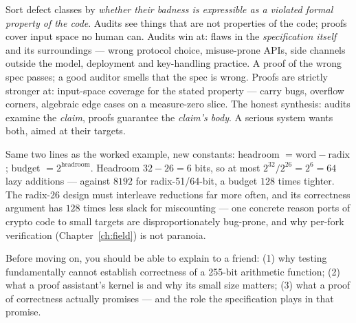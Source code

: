 \pathway Sort defect classes by \emph{whether their badness is expressible
as a violated formal property of the code}. Audits see things that are not
properties of the code; proofs cover input space no human can.
\answer Audits win at: flaws in the \emph{specification itself} and its
surroundings --- wrong protocol choice, misuse-prone APIs, side channels
outside the model, deployment and key-handling practice. A proof of the
wrong spec passes; a good auditor smells that the spec is wrong. Proofs are
strictly stronger at: input-space coverage for the stated property ---
carry bugs, overflow corners, algebraic edge cases on a measure-zero slice.
The honest synthesis: audits examine the \emph{claim}, proofs guarantee the
\emph{claim's body}. A serious system wants both, aimed at their targets.

\pathway Same two lines as the worked example, new constants: headroom
$= \text{word} - \text{radix}$; budget $= 2^{\text{headroom}}$.
\answer Headroom $32 - 26 = 6$ bits, so at most $2^{32}/2^{26} = 2^{6} =
64$ lazy additions --- against $8192$ for radix-51/64-bit, a budget $128$
times tighter. The radix-26 design must interleave reductions far more
often, and its correctness argument has $128$ times less slack for
miscounting --- one concrete reason ports of crypto code to small targets
are disproportionately bug-prone, and why per-fork verification
(Chapter~\ref{ch:field}) is not paranoia.

\begin{checkpoint}
Before moving on, you should be able to explain to a friend:
(1) why testing fundamentally cannot establish correctness of a 255-bit
arithmetic function; (2) what a proof assistant's kernel is and why its small
size matters; (3) what a proof of correctness actually promises --- and the
role the specification plays in that promise.
\end{checkpoint}
